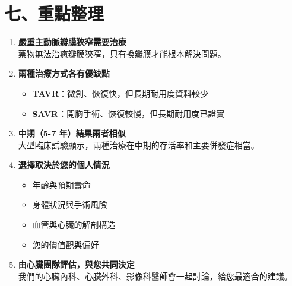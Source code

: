 \documentclass[12pt,a4paper]{article}
\begin{document}
\section*{\textcolor{emergency_red}{\Large 七、重點整理}}

\begin{tcolorbox}[colback=yellow!5, colframe=pda_orange, arc=10pt, boxrule=2pt,
    title={\Large\bfseries\color{white} 您需要記住的重點}, colbacktitle=pda_orange]

\begin{enumerate}[leftmargin=*, itemsep=12pt, label=\textcolor{emergency_red}{\arabic*.}]

    \item \textbf{嚴重主動脈瓣膜狹窄需要治療}\\
    藥物無法治癒瓣膜狹窄，只有換瓣膜才能根本解決問題。

    \item \textbf{兩種治療方式各有優缺點}
    \begin{itemize}[leftmargin=*]
        \item \textbf{TAVR}：微創、恢復快，但長期耐用度資料較少
        \item \textbf{SAVR}：開胸手術、恢復較慢，但長期耐用度已證實
    \end{itemize}

    \item \textbf{中期（5-7 年）結果兩者相似}\\
    大型臨床試驗顯示，兩種治療在中期的存活率和主要併發症相當。

    \item \textbf{選擇取決於您的個人情況}
    \begin{itemize}[leftmargin=*]
        \item 年齡與預期壽命
        \item 身體狀況與手術風險
        \item 血管與心臟的解剖構造
        \item 您的價值觀與偏好
    \end{itemize}

    \item \textbf{由心臟團隊評估，與您共同決定}\\
    我們的心臟內科、心臟外科、影像科醫師會一起討論，給您最適合的建議。

\end{enumerate}

\end{tcolorbox}
\end{document}
